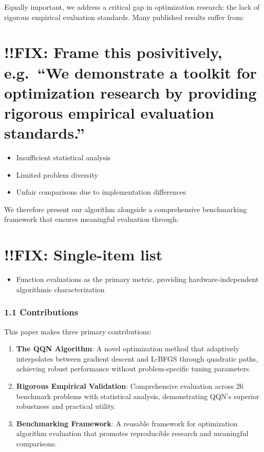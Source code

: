 Equally important, we address a critical gap in optimization research: the lack of rigorous empirical evaluation standards. Many published results suffer from:

\hypertarget{fix-frame-this-posivitively-e.g.-we-demonstrate-a-toolkit-for-optimization-research-by-providing-rigorous-empirical-evaluation-standards.}{%
\section{!!FIX: Frame this posivitively, e.g.~``We demonstrate a toolkit for optimization research by providing rigorous empirical evaluation standards.''}\label{fix-frame-this-posivitively-e.g.-we-demonstrate-a-toolkit-for-optimization-research-by-providing-rigorous-empirical-evaluation-standards.}}

\begin{itemize}
\tightlist
\item
  Insufficient statistical analysis
\item
  Limited problem diversity
\item
  Unfair comparisons due to implementation differences
\end{itemize}

We therefore present our algorithm alongside a comprehensive benchmarking framework that ensures meaningful evaluation through:

\hypertarget{fix-single-item-list}{%
\section{!!FIX: Single-item list}\label{fix-single-item-list}}

\begin{itemize}
\tightlist
\item
  Function evaluations as the primary metric, providing hardware-independent algorithmic characterization
\end{itemize}

\hypertarget{contributions}{%
\subsubsection{1.1 Contributions}\label{contributions}}

This paper makes three primary contributions:

\begin{enumerate}
\def\labelenumi{\arabic{enumi}.}
\item
  \textbf{The QQN Algorithm}: A novel optimization method that adaptively interpolates between gradient descent and L-BFGS through quadratic paths, achieving robust performance without problem-specific tuning parameters.
\item
  \textbf{Rigorous Empirical Validation}: Comprehensive evaluation across 26 benchmark problems with statistical analysis, demonstrating QQN's superior robustness and practical utility.
\item
  \textbf{Benchmarking Framework}: A reusable framework for optimization algorithm evaluation that promotes reproducible research and meaningful comparisons.
\end{enumerate}

